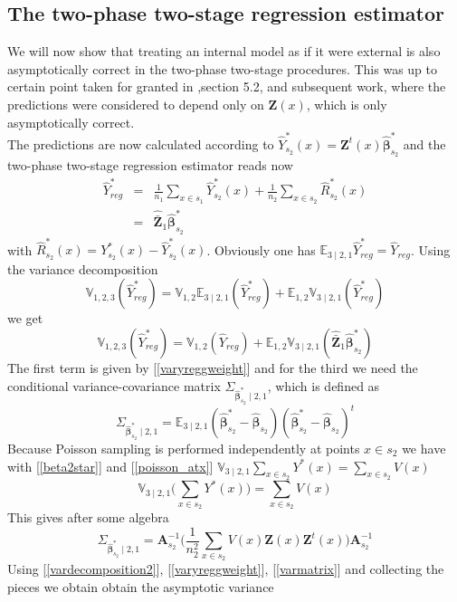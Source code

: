 \documentclass[a4paper,12pt,leqno, titlepage]{article}
\newcommand{\EX}{\mathbb{E}}
\newcommand{\VAR}{\mathbb{V}}
\begin{document}
 \subsection{The two-phase two-stage regression estimator}\label{twpphasetwostagereg}
 We will now show that treating an internal model as if it were external is also asymptotically correct in the two-phase two-stage procedures. This was up to certain point taken for granted in \cite{mandallaz},section 5.2, and subsequent work, where the predictions were considered to depend only on $\pmb{Z}(x)$, which is only asymptotically correct.\\
 The predictions are now calculated according to $\hat{Y}_{s_2}^*(x)=\pmb{Z}^t(x)\hat{\pmb{\beta}}^*_{s_2}$
 and the two-phase two-stage regression estimator reads now
 \begin{eqnarray}\label{twophasetwostagereg}
 \hat{Y}^*_{reg}&=&\frac{1}{n_1}\sum_{x\in{s_1}}\hat{Y}_{s_2}^*(x)+\frac{1}{n_2}\sum_{x\in{s_2}}\hat{R}_{s_2}^*(x) \nonumber \\
 &=&\hat{\bar{\pmb{Z}}}_1\hat{\pmb{\beta}}^*_{s_2}
 \end{eqnarray}
 with $\hat{R}_{s_2}^*(x)=Y_{s_2}^*(x)-\hat{Y}_{s_2}^*(x)$. Obviously one has
 $\EX_{3 \mid 2,1}\hat{Y}^*_{reg}=\hat{Y}_{reg}$. Using the variance decomposition
 \begin{equation}\label{vardecomposition1}
 \VAR_{1,2,3}(\hat{Y}^*_{reg})=\VAR_{1,2}\EX_{3 \mid 2,1}(\hat{Y}^*_{reg})+\EX_{1,2}\VAR_{3 \mid 2,1}(\hat{Y}^*_{reg})
 \end{equation}
 we get
 \begin{equation}\label{vardecomposition2}
 \VAR_{1,2,3}(\hat{Y}^*_{reg})=\VAR_{1,2}(\hat{Y}_{reg})+\EX_{1,2}\VAR_{3 \mid 2,1}(\hat{\bar{\pmb{Z}}}_1\hat{\pmb{\beta}}^*_{s_2})
 \end{equation}
 The first term is given by [\ref{varyreggweight}] and for the third we need the conditional variance-covariance matrix $\Sigma_{\hat{\pmb{\beta}}^*_{s_2}\mid{2,1}}$, which is defined as
 \begin{equation*}
 \Sigma_{\hat{\pmb{\beta}}^*_{s_2}\mid{2,1}}=\EX_{3 \mid 2,1}(\hat{\pmb{\beta}}^*_{s_2}-\hat{\pmb{\beta}}_{s_2})(\hat{\pmb{\beta}}^*_{s_2}-\hat{\pmb{\beta}}_{s_2})^t
 \end{equation*}
 Because Poisson sampling is performed independently at points $x\in{s_2}$ we have with [\ref{beta2star}] and [\ref{poisson_atx}] $\VAR_{3\mid 2,1}\sum_{x\in{s_2}}Y^*(x)=\sum_{x\in{s_2}}V(x)$
 \begin{equation*}
 \VAR_{3\mid 2,1}\Big(\sum_{x\in{s_2}}Y^*(x)\Big) =\sum_{x\in{s_2}}V(x)
 \end{equation*}
 This gives after some algebra
 \begin{equation}\label{conditioncovariancematrix1}
 \Sigma_{\hat{\pmb{\beta}}^*_{s_2}\mid 2,1}=\pmb{A}^{-1}_{s_2}\Big(
 \frac{1}{n^2_2}\sum_{x\in{s_2}}V(x)\pmb{Z}(x)\pmb{Z}^t(x)\Big)\pmb{A}^{-1}_{s_2}
 \end{equation}
 Using [\ref{vardecomposition2}], [\ref{varyreggweight}], [\ref{varmatrix}] and collecting the pieces we obtain obtain the asymptotic variance
\end{document}
